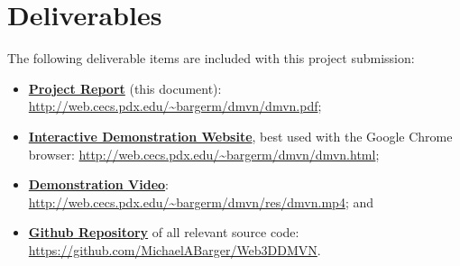 \section {Deliverables}
The following deliverable items are included with this project submission:
\begin{itemize}
    \item \href{http://web.cecs.pdx.edu/~bargerm/dmvn/dmvn.pdf}{\textbf{Project Report}} (this document): \url{http://web.cecs.pdx.edu/~bargerm/dmvn/dmvn.pdf};
    \item \href{http://web.cecs.pdx.edu/~bargerm/dmvn/dmvn.html}{\textbf{Interactive Demonstration Website}}, best used with the Google Chrome browser: \url{http://web.cecs.pdx.edu/~bargerm/dmvn/dmvn.html};
    \item \href{http://web.cecs.pdx.edu/~bargerm/dmvn/res/dmvn.mp4}{\textbf{Demonstration Video}}: \url{http://web.cecs.pdx.edu/~bargerm/dmvn/res/dmvn.mp4}; and
    \item \href{https://github.com/MichaelABarger/Web3DDMVN}{\textbf{Github Repository}} of all relevant source code: \url{https://github.com/MichaelABarger/Web3DDMVN}.
\end{itemize}

